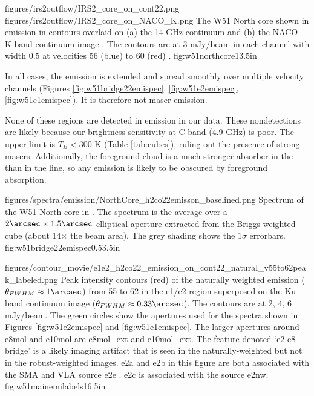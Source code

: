 \FigureTwo
{figures/irs2outflow/IRS2_core_on_cont22.png}
{figures/irs2outflow/IRS2_core_on_NACO_K.png}
{The W51 North core shown in \formaldehyde \twotwo emission in contours
overlaid on (a) the 14 GHz continuum and (b) the NACO K-band continuum image
\citep{Barbosa2008a}.  The contours are at 3 mJy/beam in each channel with
width 0.5 \kms at velocities 56 (blue) to 60 (red) \kms.
}
{fig:w51northcore}{1}{3.5in}

In all cases, the emission is extended and spread smoothly over multiple
velocity channels (Figures 
\ref{fig:w51bridge22emispec}, \ref{fig:w51e2emispec}, \ref{fig:w51e1emispec}).
It is therefore not maser emission.

None of these regions are detected in \oneone emission in our data.  These
nondetections are likely because our brightness sensitivity at C-band (4.9 GHz)
is poor.  The upper limit is $T_B<300$ K (Table \ref{tab:cubes}), ruling
out the presence of strong masers.  Additionally, the foreground cloud is a
much stronger absorber in the \oneone than in the \twotwo line, so any emission
is likely to be obscured by foreground absorption.


\Figure
{{figures/spectra/emission/NorthCore_h2co22emisson_baselined}.png}
{Spectrum of the W51 North core in \ortho \twotwo.  The spectrum
is the average over a $2\arcsec\times1.5\arcsec$ elliptical aperture extracted
from the Briggs-weighted cube (about 14$\times$ the beam area).  The grey
shading shows the $1\sigma$
errorbars.
}
{fig:w51bridge22emispec}{0.5}{3.5in}

\Figure
{figures/contour_movie/e1e2_h2co22_emission_on_cont22_natural_v55to62peak_labeled.png}
{ Peak intensity contours (red) of the naturally weighted \formaldehyde \twotwo
emission ($\theta_{FWHM}\approx1\arcsec$) from 55 to 62 \kms in the e1/e2
region superposed on the Ku-band continuum image
($\theta_{FWHM}\approx0.33\arcsec$).  The contours are at 2, 4, 6
mJy/beam.  The green circles show
the apertures used for the spectra shown in Figures
\ref{fig:w51e2emispec} and
\ref{fig:w51e1emispec}.  The larger apertures around e8mol and e10mol are
e8mol\_ext and e10mol\_ext.  The feature denoted `e2-e8 bridge' is a likely
imaging artifact that is seen in the naturally-weighted but not in the
robust-weighted images.  e2a and e2b in this figure are both associated with
the SMA and VLA source e2e \citep{Shi2010a,Goddi2016a}.  e2c is associated with
the source e2nw.
}{fig:w51mainemilabels}{1}{6.5in}

